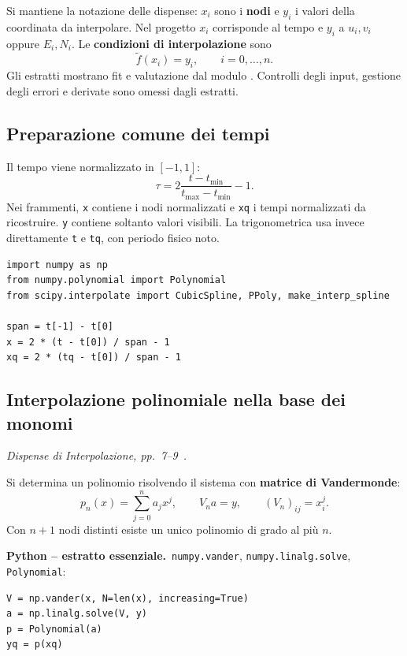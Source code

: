 \documentclass[11pt,a4paper]{article}
\newcommand{\slides}[1]{\textit{Dispense di Interpolazione, pp.~#1~\cite{dispense}.}}
\newcommand{\python}{\textbf{Python -- estratto essenziale.}}
\numberwithin{equation}{section}
\begin{document}
Si mantiene la notazione delle dispense: $x_i$ sono i \textbf{nodi} e
$y_i$ i valori della coordinata da interpolare. Nel progetto $x_i$
corrisponde al tempo e $y_i$ a $u_i,v_i$ oppure $E_i,N_i$.
Le \textbf{condizioni di interpolazione} sono
\begin{equation}
 \widetilde f(x_i)=y_i,\qquad i=0,\ldots,n.
\end{equation}
Gli estratti mostrano fit e valutazione dal modulo
. Controlli degli input,
gestione degli errori e derivate sono omessi dagli estratti.

\subsection{Preparazione comune dei tempi}
Il tempo viene normalizzato in $[-1,1]$:
\begin{equation}
 \tau=2\frac{t-t_{\min}}{t_{\max}-t_{\min}}-1.
\end{equation}
Nei frammenti, \texttt{x} contiene i nodi normalizzati e \texttt{xq} i
tempi normalizzati da ricostruire. \texttt{y} contiene soltanto valori
visibili. La trigonometrica usa invece direttamente \texttt{t} e
\texttt{tq}, con periodo fisico noto.
\begin{lstlisting}
import numpy as np
from numpy.polynomial import Polynomial
from scipy.interpolate import CubicSpline, PPoly, make_interp_spline

span = t[-1] - t[0]
x = 2 * (t - t[0]) / span - 1
xq = 2 * (tq - t[0]) / span - 1
\end{lstlisting}

\subsection{Interpolazione polinomiale nella base dei monomi}
\slides{7--9}

Si determina un polinomio risolvendo il sistema con \textbf{matrice di
Vandermonde}:
\begin{equation}
 p_n(x)=\sum_{j=0}^{n}a_jx^j,\qquad
 V_n a=y,\qquad (V_n)_{ij}=x_i^j.
\end{equation}
Con $n+1$ nodi distinti esiste un unico polinomio di grado al più $n$.

\python\ \texttt{numpy.vander}, \texttt{numpy.linalg.solve},
\texttt{Polynomial}:
\begin{lstlisting}
V = np.vander(x, N=len(x), increasing=True)
a = np.linalg.solve(V, y)
p = Polynomial(a)
yq = p(xq)
\end{lstlisting}
\end{document}
